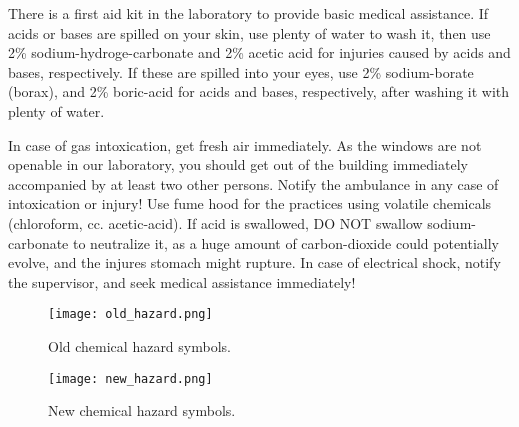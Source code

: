 \documentclass{article}
\begin{document}
There is a first aid kit in the laboratory to provide basic medical assistance. If acids or bases are spilled on your skin, use plenty of water to wash it, then use 2\% sodium-hydroge-carbonate and 2\% acetic acid for injuries caused by acids and bases, respectively. If these are spilled into your eyes, use 2\% sodium-borate (borax), and 2\% boric-acid for acids and bases, respectively, after washing it with plenty of water. 

In case of gas intoxication, get fresh air immediately. As the windows are not openable in our laboratory, you should get out of the building immediately accompanied by at least two other persons. Notify the ambulance in any case of intoxication or injury! Use fume hood for the practices using volatile chemicals (chloroform, cc. acetic-acid). If acid is swallowed, DO NOT swallow sodium-carbonate to neutralize it, as a huge amount of carbon-dioxide could potentially evolve, and the injures stomach might rupture. In case of electrical shock, notify the supervisor, and seek medical assistance immediately!


\begin{figure}
  \centering
  \texttt{[image: old\_hazard.png]}
  \caption{Old chemical hazard symbols.}
\end{figure}


\begin{figure}
  \centering
  \texttt{[image: new\_hazard.png]}
  \caption{New chemical hazard symbols.}
\end{figure}
\end{document}
